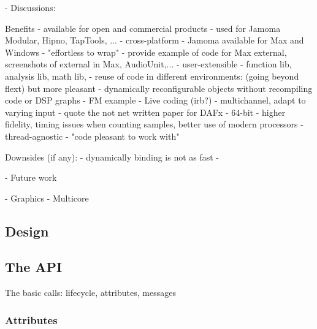 \documentclass[twoside,10pt]{article}
\begin{document}
- Discussions:


    Benefits
        - available for open and commercial products - used for Jamoma Modular, Hipno, TapTools, ...
        - cross-platform - Jamoma available for Max and Windows
        - "effortless to wrap" -  provide example of code for Max external, screenshots of external in Max, AudioUnit,...
        - user-extensible - function lib, analysis lib, math lib, 
        - reuse of code in different environments: (going beyond flext) but more pleasant
        - dynamically reconfigurable objects without recompiling code or DSP graphs
            - FM example
            - Live coding (irb?)
        - multichannel, adapt to varying input  - quote the not net written paper for DAFx
        - 64-bit - higher fidelity, timing issues when counting samples, better use of modern processors
        - thread-agnostic
        - "code pleasant to work with"

    Downsides (if any):
        -  dynamically binding is not as fast
        - 
    
- Future work

    - Graphics
    - Multicore
    
    

    
    

\subsection{Design}

\subsection{The API}

The basic calls: lifecycle, attributes, messages

\subsubsection{Attributes}
\end{document}
